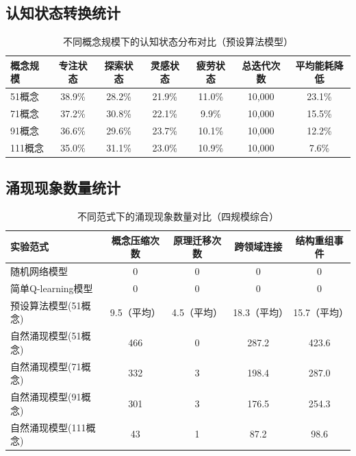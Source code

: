 \documentclass[12pt,a4paper]{article}
\begin{document}
\subsection{认知状态转换统计}

\begin{table}[H]
\centering
\caption{不同概念规模下的认知状态分布对比（预设算法模型）}
\label{tab:cognitive_states_comparison}
\begin{tabular}{p{3cm}cccccc}
\toprule
\textbf{概念规模} & \textbf{专注状态} & \textbf{探索状态} & \textbf{灵感状态} & \textbf{疲劳状态} & \textbf{总迭代次数} & \textbf{平均能耗降低} \\
\midrule
51概念 & 38.9\% & 28.2\% & 21.9\% & 11.0\% & 10,000 & 23.1\% \\
71概念 & 37.2\% & 30.8\% & 22.1\% & 9.9\% & 10,000 & 15.5\% \\
91概念 & 36.6\% & 29.6\% & 23.7\% & 10.1\% & 10,000 & 12.2\% \\
111概念 & 35.0\% & 31.1\% & 23.0\% & 10.9\% & 10,000 & 7.6\% \\
\bottomrule
\end{tabular}
\end{table}

\subsection{涌现现象数量统计}

\begin{table}[H]
\centering
\caption{不同范式下的涌现现象数量对比（四规模综合）}
\label{tab:emergence_quantity_comparison}
\begin{tabular}{p{3cm}cccc}
\toprule
\textbf{实验范式} & \textbf{概念压缩次数} & \textbf{原理迁移次数} & \textbf{跨领域连接} & \textbf{结构重组事件} \\
\midrule
随机网络模型 & 0 & 0 & 0 & 0 \\
简单Q-learning模型 & 0 & 0 & 0 & 0 \\
预设算法模型(51概念) & 9.5（平均） & 4.5（平均） & 18.3（平均） & 15.7（平均） \\
自然涌现模型(51概念) & 466 & 0 & 287.2 & 423.6 \\
自然涌现模型(71概念) & 332 & 3 & 198.4 & 287.0 \\
自然涌现模型(91概念) & 301 & 3 & 176.5 & 254.3 \\
自然涌现模型(111概念) & 43 & 1 & 87.2 & 98.6 \\
\bottomrule
\end{tabular}
\end{table}
\end{document}
